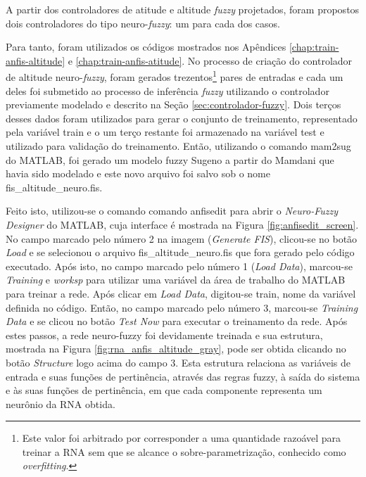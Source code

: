 A partir dos controladores de atitude e altitude \textit{fuzzy} projetados, foram propostos dois controladores do tipo neuro-\textit{fuzzy}: um para cada dos casos.

Para tanto, foram utilizados os códigos mostrados nos Apêndices \ref{chap:train-anfis-altitude} e \ref{chap:train-anfis-atitude}. No processo de criação do controlador de altitude neuro-\textit{fuzzy}, foram gerados trezentos\footnote{Este valor foi arbitrado por corresponder a uma quantidade razoável para treinar a RNA sem que se alcance o sobre-parametrização, conhecido como \textit{overfitting}.} pares de entradas e cada um deles foi submetido ao processo de inferência \textit{fuzzy} utilizando o controlador previamente modelado e descrito na Seção \ref{sec:controlador-fuzzy}. Dois terços desses dados foram utilizados para gerar o conjunto de treinamento, representado pela variável {\ttfamily train} e o um terço restante foi armazenado na variável {\ttfamily test} e utilizado para validação do treinamento. Então, utilizando o comando {\ttfamily mam2sug} do MATLAB, foi gerado um modelo fuzzy Sugeno a partir do Mamdani que havia sido modelado e este novo arquivo foi salvo sob o nome {\ttfamily fis\_altitude\_neuro.fis}.

Feito isto, utilizou-se o comando comando {\ttfamily anfisedit} para abrir o \textit{Neuro-Fuzzy Designer} do MATLAB, cuja interface é mostrada na Figura \ref{fig:anfisedit_screen}. No campo marcado pelo número 2 na imagem (\textit{Generate FIS}), clicou-se no botão \textit{Load} e se selecionou o arquivo {\ttfamily fis\_altitude\_neuro.fis} que fora gerado pelo código executado. Após isto, no campo marcado pelo número 1 (\textit{Load Data}), marcou-se \textit{Training} e \textit{worksp} para utilizar uma variável da área de trabalho do MATLAB para treinar a rede. Após clicar em \textit{Load Data}, digitou-se {\ttfamily train}, nome da variável definida no código. Então, no campo marcado pelo número 3, marcou-se \textit{Training Data} e se clicou no botão \textit{Test Now} para executar o treinamento da rede. Após estes passos, a rede neuro-fuzzy foi devidamente treinada e sua estrutura, mostrada na Figura \ref{fig:rna_anfis_altitude_gray}, pode ser obtida clicando no botão \textit{Structure} logo acima do campo 3. Esta estrutura relaciona as variáveis de entrada e suas funções de pertinência, através das regras fuzzy, à saída do sistema e às suas funções de pertinência, em que cada componente representa um neurônio da RNA obtida. 


